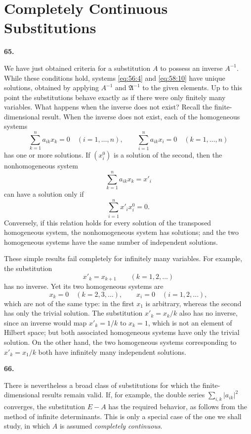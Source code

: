 \documentclass[
  paper=b5,
  fontsize=13pt,
  twoside=true,
  open=any,
  bookmarkpackage=false,
  chapterprefix=true,
  headings=normal
]{scrbook}
\theoremstyle{definition}
\newcommand{\numberedparagraph}[1]{%
  \par\medskip\phantomsection\label{sec:#1}%
  \noindent\textbf{#1.}\enspace
}
\begin{document}
\section{Completely Continuous Substitutions}
\label{sec:completely-continuous-substitutions}

\numberedparagraph{65}
We have just obtained criteria for a substitution $A$ to possess an inverse
$A^{-1}$. While these conditions hold, systems \eqref{eq:56:4} and
\eqref{eq:58:10} have unique solutions, obtained by applying $A^{-1}$ and
$\mathfrak A^{-1}$ to the given elements. Up to this point the substitutions
behave exactly as if there were only finitely many variables. What happens
when the inverse does not exist?
Recall the finite-dimensional result. When the inverse does not exist,
each of the homogeneous systems
\[
 \sum_{k=1}^{n}a_{ik}x_k=0\quad(i=1,\ldots,n),
 \qquad
 \sum_{i=1}^{n}a_{ik}x_i=0\quad(k=1,\ldots,n)
\]
has one or more solutions. If $(x_i^0)$ is a solution of the second, then
the nonhomogeneous system
\[
  \sum_{k=1}^{n}a_{ik}x_k=x'_i
\]
can have a solution only if
\[
  \sum_{i=1}^{n}x'_i x_i^0=0.
\]
Conversely, if this relation holds for every solution of the transposed
homogeneous system, the nonhomogeneous system has solutions; and the two
homogeneous systems have the same number of independent solutions.

These simple results fail completely for infinitely many variables. For
example, the substitution
\[
  x'_k=x_{k+1}\qquad(k=1,2,\ldots)
\]
has no inverse. Yet its two homogeneous systems are
\[
  x_k=0\quad(k=2,3,\ldots),
  \qquad
  x_i=0\quad(i=1,2,\ldots),
\]
which are not of the same type: in the first $x_1$ is arbitrary, whereas
the second has only the trivial solution.
The substitution $x'_k=x_k/k$ also has no inverse, since an inverse would
map $x'_k=1/k$ to $x_k=1$, which is not an element of Hilbert space; but
both associated homogeneous systems have only the trivial solution. On
the other hand, the two homogeneous systems corresponding to
$x'_k=x_1/k$ both have infinitely many independent solutions.

\numberedparagraph{66}
There is nevertheless a broad class of substitutions for which the
finite-dimensional results remain valid. If, for example, the double
series $\sum_{i,k}|a_{ik}|^2$ converges, the substitution $E-A$ has the
required behavior, as follows from the method of infinite determinants.
This is only a special case of the one we shall study, in which $A$ is
assumed \emph{completely continuous}.
\end{document}
